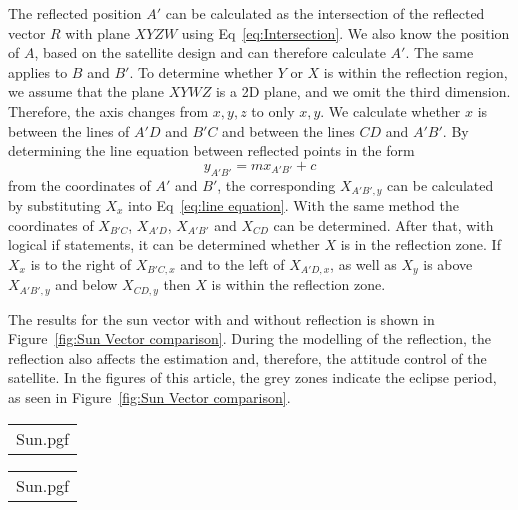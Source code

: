 The reflected position $A'$ can be calculated as the intersection of the reflected vector $R$ with plane $XYZW$ using Eq~\ref{eq:Intersection}. We also know the position of $A$, based on the satellite design and can therefore calculate $A'$. The same applies to $B$ and $B'$. To determine whether $Y$ or $X$ is within the reflection region, we assume that the plane $XYWZ$ is a 2D plane, and we omit the third dimension. Therefore, the axis changes from $x, y, z$ to only $x, y$. We calculate whether $x$ is between the lines of $A'D$ and $B'C$ and between the lines $CD$ and $A'B'$. By determining the line equation between reflected points in the form 
\begin{equation}
	y_{A'B'} = mx_{A'B'} + c
	\label{eq:line equation}
\end{equation}
from the coordinates of $A'$ and $B'$, the corresponding $X_{A'B',y}$ can be calculated by substituting $X_x$ into Eq~\ref{eq:line equation}. With the same method the coordinates of $X_{B'C}$, $X_{A'D}$, $X_{A'B'}$ and $X_{CD}$ can be determined. After that, with logical if statements, it can be determined whether $X$ is in the reflection zone. If $X_x$ is to the right of $X_{B'C,x}$ and to the left of $X_{A'D,x}$, as well as $X_y$ is above $X_{A'B',y}$ and below $X_{CD,y}$ then $X$ is within the reflection zone. 

The results for the sun vector with and without reflection is shown in Figure~\ref{fig:Sun Vector comparison}. During the modelling of the reflection, the reflection also affects the estimation and, therefore, the attitude control of the satellite. In the figures of this article, the grey zones indicate the eclipse period, as seen in Figure~\ref{fig:Sun Vector comparison}.

\begin{figure*}[!htb]
	\begin{tabular}{@{}c@{}}
		\centering
		{Sun.pgf}
		\label{fig:Sun Vector comparison with reflection}
	\end{tabular}
	\begin{tabular}{@{}c@{}}
		\centering
		{Sun.pgf} 
		\label{fig:Sun Vector comparison without reflection}
	\end{tabular}
	
	\caption{Comparison of Sun Vector with and without Reflection}
	\label{fig:Sun Vector comparison}
	
\end{figure*}

